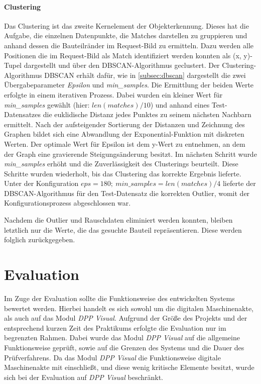 \documentclass[
    type=Projektarbeit,
    status=draft, %
    language=german, %
    bibengine=bibtex,
]{unibwm-inf-thesis}
\begin{document}
    \subsubsection{Clustering} \label{subsubsec:clustering}
    Das Clustering ist das zweite Kernelement der Objekterkennung.
    Dieses hat die Aufgabe, die einzelnen Datenpunkte, die Matches darstellen zu gruppieren und anhand dessen die Bauteilränder im Request-Bild zu ermitteln.
    Dazu werden alle Positionen die im Request-Bild als Match identifiziert werden konnten als (x, y)-Tupel dargestellt und über den DBSCAN-Algorithmus geclustert.
    Der Clustering-Algorithmus DBSCAN erhält dafür, wie in \autoref{subsec:dbscan} dargestellt die zwei Übergabeparameter \textit{Epsilon} und \textit{min\_samples}.
    Die Ermittlung der beiden Werte erfolgte in einem iterativen Prozess.
    Dabei wurden ein kleiner Wert für \textit{min\_samples} gewählt (hier: $len(matches) / 10 $) und anhand eines Test-Datensatzes die euklidische Distanz jedes Punktes zu seinem nächsten Nachbarn ermittelt.
    Nach der aufsteigender Sortierung der Distanzen und Zeichnung des Graphen bildet sich eine Abwandlung der Exponential-Funktion mit diskreten Werten.
    Der optimale Wert für Epsilon ist dem y-Wert zu entnehmen, an dem der Graph eine gravierende Steigungsänderung besitzt.\citep{Maklin2019}
    Im nächsten Schritt wurde \textit{min\_samples} erhöht und die Zuverlässigkeit des Clusterings beurteilt.
    Diese Schritte wurden wiederholt, bis das Clustering das korrekte Ergebnis lieferte.
    Unter der Konfiguration $eps = 180; ~ min\_samples=len(matches) / 4$ lieferte der DBSCAN-Algorithmus für den Test-Datensatz die korrekten Outlier, womit der Konfigurationsprozess abgeschlossen war.

    Nachdem die Outlier und Rauschdaten eliminiert werden konnten, bleiben letztlich nur die Werte, die das gesuchte Bauteil repräsentieren.
    Diese werden folglich zurückgegeben.


    \chapter{Evaluation}
    Im Zuge der Evaluation sollte die Funktionsweise des entwickelten Systems bewertet werden.
    Hierbei handelt es sich sowohl um die digitalen Maschinenakte, als auch auf das Modul \textit{DPP Visual}.
    Aufgrund der Größe des Projekts und der entsprechend kurzen Zeit des Praktikums erfolgte die Evaluation nur im begrenzten Rahmen.
    Dabei wurde das Modul \textit{DPP Visual} auf die allgemeine Funktionsweise geprüft, sowie auf die Grenzen des Systems und die Dauer des Prüfverfahrens.
    Da das Modul \textit{DPP Visual} die Funktionsweise digitale Maschinenakte mit einschließt, und diese wenig kritische Elemente besitzt, wurde sich bei der Evaluation auf \textit{DPP Visual} beschränkt.
\end{document}
